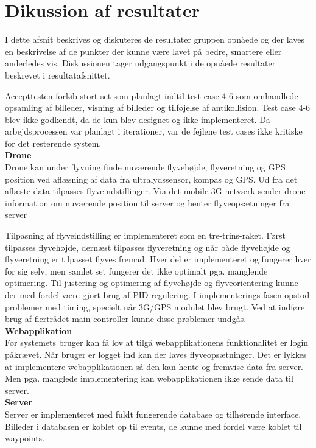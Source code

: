 \section{Dikussion af resultater}

I dette afsnit beskrives og diskuteres de resultater gruppen opnåede og der laves en beskrivelse af de punkter der kunne være lavet på bedre, smartere eller anderledes vis. Diskussionen tager udgangspunkt i de opnåede resultater beskrevet i resultatafsnittet.

Accepttesten forløb stort set som planlagt indtil test case 4-6 som omhandlede opsamling af billeder, visning af billeder og tilføjelse af antikollision. Test case 4-6 blev ikke godkendt, da de kun blev designet og ikke implementeret. Da arbejdsprocessen var planlagt i iterationer, var de fejlene test cases ikke kritiske for det resterende system.\\

\textbf{Drone}\\
Drone kan under flyvning finde nuværende flyvehøjde, flyveretning og GPS position ved aflæsning af data fra ultralydssensor, kompas og GPS.  Ud fra det aflæste data tilpasses flyveindstillinger. Via det mobile 3G-netværk sender drone information om nuværende position til server og henter flyveopsætninger fra server

Tilpasning af flyveindstilling er implementeret som en tre-trins-raket. Først tilpasses flyvehøjde, dernæst tilpasses flyveretning og når både flyvehøjde og flyveretning er tilpasset flyves fremad. Hver del er implementeret og fungerer hver for sig selv, men samlet set fungerer det ikke optimalt pga. manglende optimering. Til justering og optimering af flyvehøjde og flyveorientering kunne der med fordel være gjort brug af PID regulering.  I implementerings fasen opstod problemer med timing, specielt når 3G/GPS modulet blev brugt. Ved at indføre brug af flertrådet main controller kunne disse problemer undgås. \\

\textbf{Webapplikation}\\
Før systemets bruger kan få lov at tilgå webapplikationens funktionalitet er login påkrævet. Når bruger er logget ind kan der laves flyveopsætninger. Det er lykkes at implementere webapplikationen så den kan hente og fremvise data fra server. 
Men pga. manglede implementering kan webapplikationen ikke sende data til server.\\


\textbf{Server}\\
Server er implementeret med fuldt fungerende database og tilhørende interface. Billeder i databasen er koblet op til events, de kunne med fordel være koblet til waypoints.
